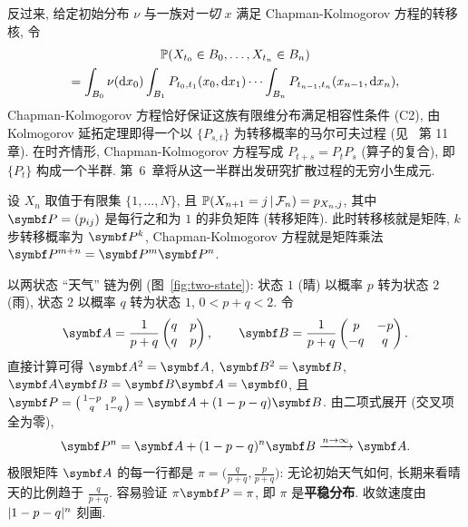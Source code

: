 \begin{remark}
反过来, 给定初始分布 $\nu$ 与一族对\emph{一切} $x$ 满足 Chapman-Kolmogorov 方程的转移核, 令
\begin{multline*}
\P(X_{t_0}\in B_0,\dots,X_{t_n}\in B_n)\\
=\int_{B_0}\nu(\dd x_0)\int_{B_1}P_{t_0,t_1}(x_0,\dd x_1)\cdots\int_{B_n}P_{t_{n-1},t_n}(x_{n-1},\dd x_n),
\end{multline*}
Chapman-Kolmogorov 方程恰好保证这族有限维分布满足相容性条件 (C2), 由 Kolmogorov 延拓定理即得一个以 $\{P_{s,t}\}$ 为转移概率的马尔可夫过程 (见~\cite{kallenberg} 第 11 章). 在时齐情形, Chapman-Kolmogorov 方程写成 $P_{t+s}=P_tP_s$ (算子的复合), 即 $\{P_t\}$ 构成一个半群. 第~6~章将从这一半群出发研究扩散过程的无穷小生成元.
\end{remark}

\begin{example}[有限状态马氏链]\label{ex:markov-chain}
设 $X_n$ 取值于有限集 $\{1,\dots,N\}$, 且 $\P(X_{n+1}=j\,|\,\mathcal{F}_n)=p_{X_n,j}$, 其中 $\mat{P}=(p_{ij})$ 是每行之和为 $1$ 的非负矩阵 (转移矩阵). 此时转移核就是矩阵, $k$ 步转移概率为 $\mat{P}^k$, Chapman-Kolmogorov 方程就是矩阵乘法 $\mat{P}^{m+n}=\mat{P}^m\mat{P}^n$.

以两状态 ``天气'' 链为例 (图~\ref{fig:two-state}): 状态 $1$ (晴) 以概率 $p$ 转为状态 $2$ (雨), 状态 $2$ 以概率 $q$ 转为状态 $1$, $0<p+q<2$. 令
\[
\mat{A}=\frac{1}{p+q}\begin{pmatrix}q&p\\q&p\end{pmatrix},\qquad \mat{B}=\frac{1}{p+q}\begin{pmatrix}p&-p\\-q&q\end{pmatrix}.
\]
直接计算可得 $\mat{A}^2=\mat{A}$, $\mat{B}^2=\mat{B}$, $\mat{A}\mat{B}=\mat{B}\mat{A}=\mat{0}$, 且 $\mat{P}=\begin{psmallmatrix}1-p&p\\q&1-q\end{psmallmatrix}=\mat{A}+(1-p-q)\mat{B}$. 由二项式展开 (交叉项全为零),
\[
\mat{P}^n=\mat{A}+(1-p-q)^n\mat{B}\xrightarrow{n\to\infty}\mat{A}.
\]
极限矩阵 $\mat{A}$ 的每一行都是 $\pi=\big(\frac{q}{p+q},\frac{p}{p+q}\big)$: 无论初始天气如何, 长期来看晴天的比例趋于 $\frac{q}{p+q}$. 容易验证 $\pi\mat{P}=\pi$, 即 $\pi$ 是\textbf{平稳分布}. 收敛速度由 $\abs{1-p-q}^n$ 刻画.
\end{example}

